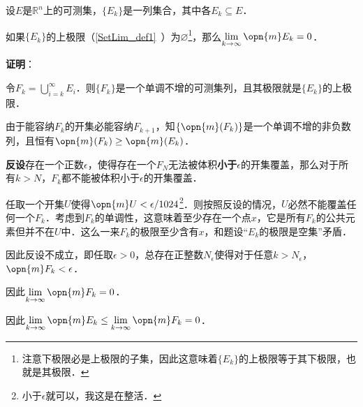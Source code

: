 



\begin{lemma}{}
设$E$是$\mathbb{R}^n$上的可测集，$\{E_k\}$是一列集合，其中各$E_k\subseteq E$．

如果$\{E_k\}$的上极限（\autoref{SetLim_def1}~）为$\varnothing$\footnote{注意下极限必是上极限的子集，因此这意味着$\{E_k\}$的上极限等于其下极限，也就是其极限．}，那么$\lim\limits_{k\to\infty}\opn{m}E_k=0$．
\end{lemma}

\textbf{证明}：

令$F_k=\bigcup_{i=k}^\infty E_i$．则$\{F_k\}$是一个单调不增的可测集列，且其极限就是$\{E_k\}$的上极限．

由于能容纳$F_k$的开集必能容纳$F_{k+1}$，知$\{\opn{m}(F_k)\}$是一个单调不增的非负数列，且恒有$\opn{m}(F_k)\geq\opn{m}(E_k)$．

\textbf{反设}存在一个正数$\epsilon$，使得存在一个$F_N$无法被体积\textbf{小于}$\epsilon$的开集覆盖，那么对于所有$k>N$，$F_k$都不能被体积小于$\epsilon$的开集覆盖．

任取一个开集$U$使得$\opn{m}U<\epsilon/1024$\footnote{小于$\epsilon$就可以，我这是在整活．}．则按照反设的情况，$U$必然不能覆盖任何一个$F_k$．考虑到$F_k$的单调性，这意味着至少存在一个点$x$，它是所有$F_k$的公共元素但并不在$U$中．这么一来$F_k$的极限至少含有$x$，和题设“$E_k$的极限是空集”矛盾．

因此反设不成立，即任取$\epsilon>0$，总存在正整数$N_\epsilon$使得对于任意$k>N_\epsilon$，$\opn{m}F_k<\epsilon$．

因此$\lim\limits_{k\to\infty}\opn{m}F_k=0$．

因此$\lim\limits_{k\to\infty}\opn{m}E_k\leq\lim\limits_{k\to\infty}\opn{m}F_k=0$．


